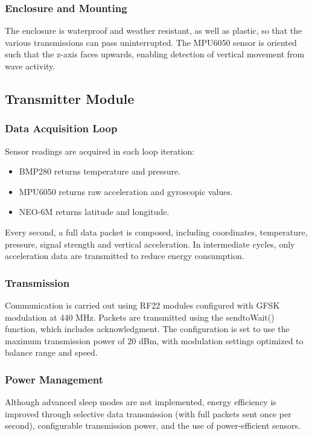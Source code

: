 \documentclass{article}
\begin{document}
    \subsubsection{Enclosure and Mounting}
    The enclosure is waterproof and weather resistant, as well as plastic, so that the various transmissions can pass uninterrupted. The MPU6050 sensor is oriented such that the z-axis faces upwards, enabling detection of vertical movement from wave activity.
    
\subsection{Transmitter Module}
    \subsubsection{Data Acquisition Loop}
    Sensor readings are acquired in each loop iteration:
    \begin{itemize}
        \item BMP280 returns temperature and pressure.
        \item MPU6050 returns raw acceleration and gyroscopic values.
        \item NEO-6M returns latitude and longitude.
    \end{itemize}
    Every second, a full data packet is composed, including coordinates, temperature, pressure, signal strength and vertical acceleration. In intermediate cycles, only acceleration data are transmitted to reduce energy consumption.
    
    \subsubsection{Transmission}
    Communication is carried out using RF22 modules configured with GFSK modulation at 440 MHz. Packets are transmitted using the sendtoWait() function, which includes acknowledgment. The configuration is set to use the maximum transmission power of 20 dBm, with modulation settings optimized to balance range and speed.
    
    \subsubsection{Power Management}
    Although advanced sleep modes are not implemented, energy efficiency is improved through selective data transmission (with full packets sent once per second), configurable transmission power, and the use of power-efficient sensors.
    
\end{document}
